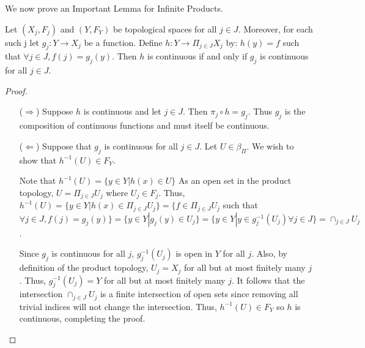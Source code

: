 We now prove an Important Lemma for Infinite Products. 
\begin{lemma}
	Let $(X_j,F_j)$ and $(Y,F_Y)$ be topological spaces for all $j \in J$. Moreover, for each such j let $g_j : Y \rightarrow X_j$ be a function. Define $h: Y \rightarrow \Pi_{j \in J}X_j$ by: $h(y) = f$ such that $\forall j \in J, f(j) = g_{j}(y)$. Then $h$ is continuous if and only if $g_j$ is continuous for all $j \in J$. 
\end{lemma}
\begin{proof}
	\begin{itemize}
		\item[($\Rightarrow$)] Suppose $h$ is continuous and let $j \in J$. Then $\pi_j \circ h = g_j$. Thus $g_j$ is the composition of continuous functions and must itself be continuous. 
		\item [($\Leftarrow$)] Suppose that $g_j$ is continuous for all $j \in J$. Let $U \in \beta_{\Pi}.$ We wish to show that $h^{-1}(U) \in F_{Y}$.
		
		Note that $h^{-1}(U) = \{y \in Y | h(x) \in U\}$ As an open set in the product topology, $U = \Pi_{j \in J}U_j$ where $U_j \in F_j$. Thus, $h^{-1}(U) = \{y \in Y | h(x) \in \Pi_{j \in J}U_j\} = \{f \in \Pi_{j \in J}U_j$ such that $\forall j \in J, f(j) = g_{j}(y)\} = \{y \in Y | g_{j}(y) \in U_j\} = \{y \in Y | y \in g_{j}^{-1}(U_j) \forall j \in J\} = \cap_{j \in J} U_j$.
		
		Since $g_j$ is continuous for all $j$, $g_{j}^{-1}(U_j)$ is open in $Y$ for all $j$. Also, by definition of the product topology, $U_j = X_j$ for all but at most finitely many $j$. Thus, $g_{j}^{-1}(U_j) = Y$ for all but at most finitely many $j$. It follows that the intersection $\cap_{j \in J} U_j$ is a finite intersection of open sets since removing all trivial indices will not change the intersection. Thus, $h^{-1}(U) \in F_Y$ so $h$ is continuous, completing the proof. 
	\end{itemize}
\end{proof}
